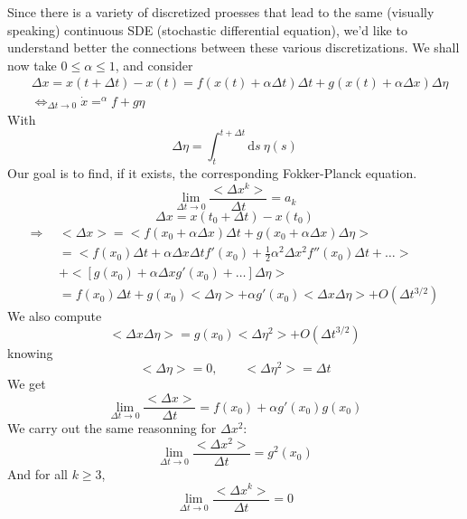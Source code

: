 \documentclass[a4paper]{book}
\theoremstyle{definition}
\theoremstyle{remark}
\begin{document}
Since there is a variety of discretized proesses that lead to the same (visually speaking) continuous SDE (stochastic differential equation), we'd like to understand better the connections between these various discretizations. We shall now take $0 \leq \alpha \leq 1$, and consider 
\begin{equation}
    \begin{aligned}
        &\Delta x = x(t + \Delta t) - x(t) = f(x(t) + \alpha\Delta t) \Delta t + g(x(t) + \alpha \Delta x)\Delta \eta \\
        &\Leftrightarrow_{\Delta t \rightarrow 0} \dot{x} =^\alpha f + g \eta
    \end{aligned}  
\end{equation}
With 
\begin{equation}
    \Delta \eta = \int_{t}^{t+\Delta t}\text{d}s~ \eta(s)
\end{equation}
Our goal is to find, if it exists, the corresponding Fokker-Planck equation. 
\begin{equation}
    \lim_{\Delta t \rightarrow 0} \frac{<\Delta x^k>}{\Delta t} = a_k 
\end{equation}
\begin{equation}
    \Delta x = x(t_0 + \Delta t ) - x(t_0)
\end{equation}
\begin{equation}
    \begin{aligned}
        \Rightarrow ~~&<\Delta x> = <f(x_0 + \alpha \Delta x)\Delta t + g(x_0 + \alpha \Delta x)\Delta \eta>\\ 
        &= <f(x_0) \Delta t + \alpha \Delta x \Delta t f'(x_0) + \frac{1}{2} \alpha^2 \Delta x^2f''(x_0)\Delta t + \dots > \\ 
        &+ <[g(x_0) + \alpha \Delta x g'(x_0) + \dots]\Delta \eta> \\
        & = f(x_0)\Delta t + g(x_0)<\Delta \eta> + \alpha g'(x_0)<\Delta x \Delta \eta> + O(\Delta t ^{3/2}) 
    \end{aligned}
\end{equation}
We also compute
\begin{equation}
    <\Delta x \Delta \eta> = g(x_0) <\Delta \eta^2> + O(\Delta t^{3/2})
\end{equation}
knowing
\begin{equation}
    <\Delta \eta> = 0, \qquad <\Delta \eta^2> = \Delta t
\end{equation}
We get 
\begin{equation}
    \lim_{\Delta t \rightarrow 0} \frac{<\Delta x>}{\Delta t} = f(x_0) + \alpha g'(x_0)g(x_0)
\end{equation}
We carry out the same reasonning for $\Delta x^2$:
\begin{equation}
    \lim_{\Delta t \rightarrow 0}\frac{<\Delta x^2>}{\Delta t} = g^2(x_0)
\end{equation}
And for all $k \geq 3$, 
\begin{equation}
    \lim_{\Delta t \rightarrow 0}\frac{<\Delta x^k>}{\Delta t} = 0
\end{equation}
\end{document}
